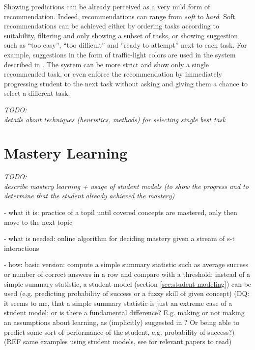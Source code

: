 Showing predictions can be already perceived as a very mild form of recommendation.
Indeed, recommendations can range from \emph{soft} to \emph{hard}.
Soft recommendations can be achieved either by
  ordering tasks according to suitability,
  filtering and only showing a subset of tasks,
  or showing suggestion such as
  ``too easy'', ``too difficult'' and ''ready to attempt'' next to each task.
For example, suggestions in the form of traffic-light colors
  are used in the system described in \cite{its-programming}.
The system can be more strict and show only a single recommended task,
  or even enforce the recommendation by immediately progressing student to
  the next task without asking and giving them a chance to select a different task.

\bigskip
\emph{TODO:\\details about techniques (heuristics, methods) for selecting single best task}


\section{Mastery Learning}
\label{sec:mastery-learning}

\emph{TODO:\\describe mastery learning + usage of student models%
(to show the progress and to determine that the student already achieved the mastery)}

- what it is: practice of a topil until covered concepts are mastered, only then move to the next topic

- what is needed: online algorithm for deciding mastery given a stream of s-t interactions

- how: basic version: compute a simple summary statistic such as average
success or number of correct answers in a row and compare with a threshold;
instead of a simple summary statistic, a student model (section
\ref{sec:student-modeling}) can be used (e.g. predicting probability of success
or a fuzzy skill of given concept)
(DQ: it seems to me, that a simple summary statistic is just an extreme case of
a student model; or is there a fundamental difference? E.g. making or not
making an assumptions about learning, as (implicitly) suggested in \cite{alg.mastery}?
Or being able to predict some sort of performance of the student, e.g. probability of
success?)
(REF same examples using student models, see \cite{alg.mastery} for relevant
papers to read)

